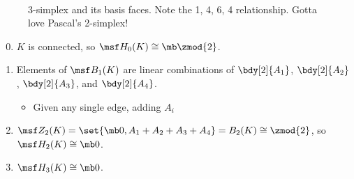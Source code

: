 \begin{solution}
\begin{figure}[H]
\begin{subfigure}{\linewidth}
    \end{subfigure}\\\vspace{0cm}
    \caption{3-simplex and its basis faces. Note the 1, 4, 6, 4 relationship.
      Gotta love Pascal's 2-simplex!}
    \label{fig:circumscribed}
  \end{figure}
  \begin{enumerate}[label=(\arabic*)]\setcounter{enumi}{-1}
    \item $K$ is connected, so $\msf H_0(K) \cong \mb \zmod{2}$.
    \item Elements of $\msf B_1(K)$ are linear combinations of $\bdy[2]{A_1}$,
      $\bdy[2]{A_2}$, $\bdy[2]{A_3}$, and $\bdy[2]{A_4}$.
      \begin{itemize}
        \item Given any single edge, adding $A_i$
      \end{itemize}
    \item $\msf Z_2(K) = \set{\mb 0, A_1 + A_2 + A_3 + A_4} = B_2(K) \cong
      \zmod{2}$, so $\msf H_2(K) \cong \mb 0$.
    \item $\msf H_3(K) \cong \mb 0$.
  \end{enumerate}
\end{solution}
